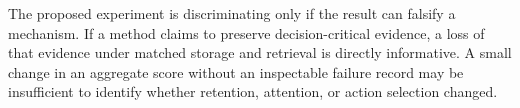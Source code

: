 The proposed experiment is discriminating only if the result can falsify a mechanism. If a method claims to preserve decision-critical evidence, a loss of that evidence under matched storage and retrieval is directly informative. A small change in an aggregate score without an inspectable failure record may be insufficient to identify whether retention, attention, or action selection changed.

